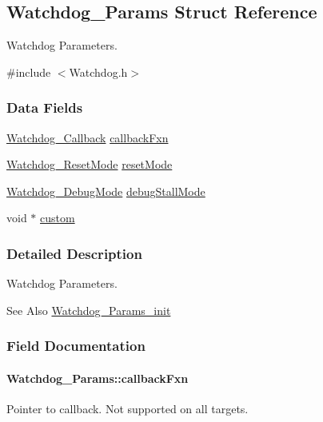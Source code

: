 \subsection{Watchdog\-\_\-\-Params Struct Reference}
\label{struct_watchdog___params}


Watchdog Parameters.  




{\ttfamily \#include $<$Watchdog.\-h$>$}

\subsubsection*{Data Fields}
\begin{DoxyCompactItemize}
\item 
\hyperlink{_watchdog_8h_a779c2644e40b760c2418b18f2c167479}{Watchdog\-\_\-\-Callback} \hyperlink{struct_watchdog___params_a710aaa2504356ab3d3f9a27ac19ddb85}{callback\-Fxn}
\item 
\hyperlink{_watchdog_8h_ada0db7216129d7dad494bb0cd0169f88}{Watchdog\-\_\-\-Reset\-Mode} \hyperlink{struct_watchdog___params_a94b5d650f8beb7dce719360404039ccf}{reset\-Mode}
\item 
\hyperlink{_watchdog_8h_ab1aa5862661c88a16b9d7bc12709d51e}{Watchdog\-\_\-\-Debug\-Mode} \hyperlink{struct_watchdog___params_abe7792eef8afa2972a4625f428b7241b}{debug\-Stall\-Mode}
\item 
void $\ast$ \hyperlink{struct_watchdog___params_aa2d75e83d9cb6bf71400934b709ec234}{custom}
\end{DoxyCompactItemize}


\subsubsection{Detailed Description}
Watchdog Parameters. 

\begin{DoxySeeAlso}{See Also}
\hyperlink{_watchdog_8h_a6a6f54cfdac33d3bf33464a212262afc}{Watchdog\-\_\-\-Params\-\_\-init} 
\end{DoxySeeAlso}


\subsubsection{Field Documentation}
\paragraph[{callback\-Fxn}]{ Watchdog\-\_\-\-Params\-::callback\-Fxn}\label{struct_watchdog___params_a710aaa2504356ab3d3f9a27ac19ddb85}
Pointer to callback. Not supported on all targets. 
